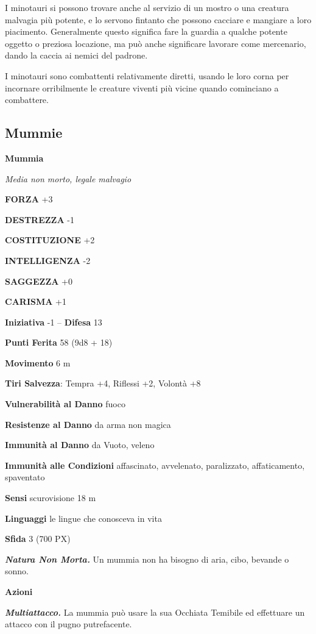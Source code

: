\begin{multicols}{2}
	I minotauri si possono trovare anche al servizio di un mostro o una creatura malvagia più potente, e lo servono fintanto che possono cacciare e mangiare a loro piacimento. Generalmente questo significa fare la guardia a qualche potente oggetto o preziosa locazione, ma può anche significare lavorare come mercenario, dando la caccia ai nemici del padrone.

	I minotauri sono combattenti relativamente diretti, usando le loro corna per incornare orribilmente le creature viventi più vicine quando cominciano a combattere.


	\subsection{Mummie}

	\medskip{}\textbf{Mummia}

	\textit{Media non morto, legale malvagio}

	\textbf{FORZA} +3

	\textbf{DESTREZZA} -1

	\textbf{COSTITUZIONE} +2

	\textbf{INTELLIGENZA} -2

	\textbf{SAGGEZZA} +0

	\textbf{CARISMA} +1

	\textbf{Iniziativa} -1 -- \textbf{Difesa} 13

	\textbf{Punti Ferita} 58 (9d8 + 18)

	\textbf{Movimento} 6 m

	\textbf{Tiri Salvezza}: Tempra +4, Riflessi +2, Volontà +8

	\textbf{Vulnerabilità al Danno} fuoco

	\textbf{Resistenze al Danno} da arma non magica

	\textbf{Immunità al Danno} da Vuoto, veleno

	\textbf{Immunità alle Condizioni} affascinato, avvelenato, paralizzato, affaticamento, spaventato

	\textbf{Sensi} scurovisione 18 m

	\textbf{Linguaggi} le lingue che conosceva in vita

	\textbf{Sfida} 3 (700 PX)

	\textit{\textbf{Natura Non Morta.}} Un mummia non ha bisogno di aria, cibo, bevande o sonno.

	\textbf{Azioni}

	\textit{\textbf{Multiattacco.}} La mummia può usare la sua Occhiata Temibile ed effettuare un attacco con il pugno putrefacente.


\end{multicols}
